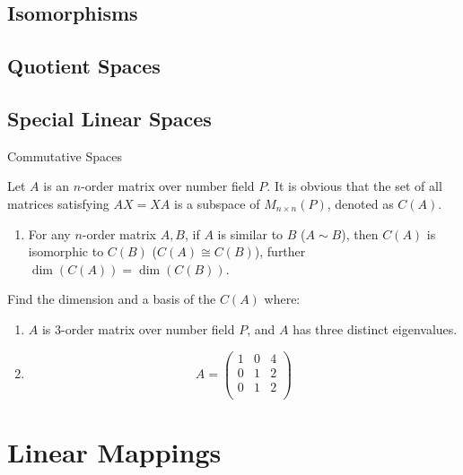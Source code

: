 \documentclass[11pt]{../../TexTemplate/elegantbook} %
\begin{document}
\section{Isomorphisms}

\section{Quotient Spaces}

\section{Special Linear Spaces}
\begin{leftbarTitle}{Commutative Spaces}\end{leftbarTitle}
Let \( A \) is an \( n \)-order matrix over number field \( P \).
It is obvious that the set of all matrices satisfying \( AX = XA \) is a subspace of \( M_{n \times n}(P) \),
denoted as \( C(A) \).

\begin{property}
    \begin{enumerate}
        \item For any \( n \)-order matrix \( A, B \), 
            if \( A \) is similar to \( B \) (\(A \sim B\)), 
            then \( C(A) \) is isomorphic to \( C(B) \) (\(C(A) \cong C(B)\)),
            further \( \dim(C(A)) = \dim(C(B)) \).
    \end{enumerate}    
\end{property}

\begin{example}
    Find the dimension and a basis of the \( C(A) \) where:
    \begin{enumerate}[label=(\roman*)]
        \item \(A\) is \(3\)-order matrix over number field \(P\), and \(A\) has three distinct eigenvalues.
        \item 
            \[
            A = 
            \begin{pmatrix} 1 & 0 & 4 \\ 0 & 1 & 2 \\ 0 & 1 & 2 \\\end{pmatrix}
            \]
    \end{enumerate}
\end{example}

\chapter{Linear Mappings}
\end{document}
